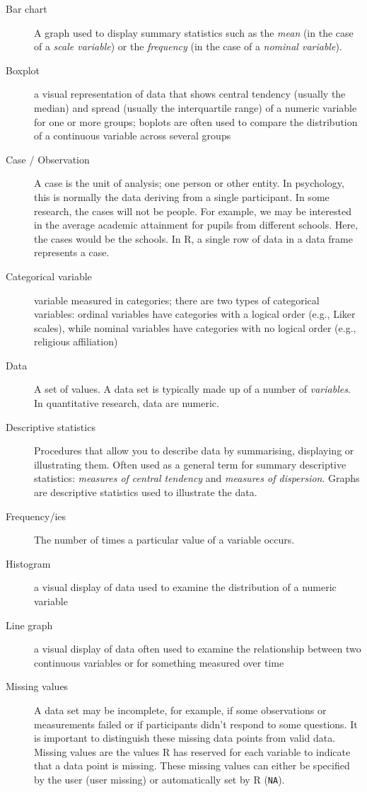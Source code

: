 \documentclass[
]{book}
\begin{document}
\begin{description}
\item[Bar chart]
A graph used to display summary statistics such as the \emph{mean} (in the case of a \emph{scale variable}) or the \emph{frequency} (in the case of a \emph{nominal variable}).
\item[Boxplot]
a visual representation of data that shows central tendency (usually the median) and spread (usually the interquartile range) of a numeric variable for one or more groups; boplots are often used to compare the distribution of a continuous variable across several groups
\item[Case / Observation]
A case is the unit of analysis; one person or other entity. In psychology, this is normally the data deriving from a single participant. In some research, the cases will not be people. For example, we may be interested in the average academic attainment for pupils from different schools. Here, the cases would be the schools. In R, a single row of data in a data frame represents a case.
\item[Categorical variable]
variable measured in categories; there are two types of categorical variables: ordinal variables have categories with a logical order (e.g., Liker scales), while nominal variables have categories with no logical order (e.g., religious affiliation)
\item[Data]
A set of values. A data set is typically made up of a number of \emph{variables}. In quantitative research, data are numeric.
\item[Descriptive statistics]
Procedures that allow you to describe data by summarising, displaying or illustrating them. Often used as a general term for summary descriptive statistics: \emph{measures of central tendency} and \emph{measures of dispersion}. Graphs are descriptive statistics used to illustrate the data.
\item[Frequency/ies]
The number of times a particular value of a variable occurs.
\item[Histogram]
a visual display of data used to examine the distribution of a numeric variable
\item[Line graph]
a visual display of data often used to examine the relationship between two continuous variables or for something measured over time
\item[Missing values]
A data set may be incomplete, for example, if some observations or measurements failed or if participants didn't respond to some questions. It is important to distinguish these missing data points from valid data. Missing values are the values R has reserved for each variable to indicate that a data point is missing. These missing values can either be specified by the user (user missing) or automatically set by R (\texttt{NA}).

\end{description}
\end{document}
